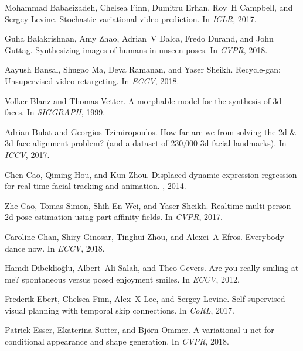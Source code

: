 \documentclass{article}
\begin{document}
\clearpage
\begin{thebibliography}{10}
	\providecommand{\url}[1]{\texttt{#1}}
	\providecommand{\urlprefix}{URL }
	\providecommand{\doi}[1]{https://doi.org/#1}
	Mohammad Babaeizadeh, Chelsea Finn, Dumitru Erhan, Roy~H Campbell, and Sergey
	Levine.
	\newblock Stochastic variational video prediction.
	\newblock In {\em ICLR}, 2017.
	
	Guha Balakrishnan, Amy Zhao, Adrian~V Dalca, Fredo Durand, and John Guttag.
	\newblock Synthesizing images of humans in unseen poses.
	\newblock In {\em CVPR}, 2018.
	
	Aayush Bansal, Shugao Ma, Deva Ramanan, and Yaser Sheikh.
	\newblock Recycle-gan: Unsupervised video retargeting.
	\newblock In {\em ECCV}, 2018.
	
	Volker Blanz and Thomas Vetter.
	\newblock A morphable model for the synthesis of 3d faces.
	\newblock In {\em SIGGRAPH}, 1999.
	
	Adrian Bulat and Georgios Tzimiropoulos.
	\newblock How far are we from solving the 2d \& 3d face alignment problem? (and
	a dataset of 230,000 3d facial landmarks).
	\newblock In {\em ICCV}, 2017.
	
	Chen Cao, Qiming Hou, and Kun Zhou.
	\newblock Displaced dynamic expression regression for real-time facial tracking
	and animation.
	, 2014.
	
	Zhe Cao, Tomas Simon, Shih-En Wei, and Yaser Sheikh.
	\newblock Realtime multi-person 2d pose estimation using part affinity fields.
	\newblock In {\em CVPR}, 2017.
	
	Caroline Chan, Shiry Ginosar, Tinghui Zhou, and Alexei~A Efros.
	\newblock Everybody dance now.
	\newblock In {\em ECCV}, 2018.
	
	Hamdi Dibeklio{\u{g}}lu, Albert~Ali Salah, and Theo Gevers.
	\newblock Are you really smiling at me? spontaneous versus posed enjoyment
	smiles.
	\newblock In {\em ECCV}, 2012.
	
	Frederik Ebert, Chelsea Finn, Alex~X Lee, and Sergey Levine.
	\newblock Self-supervised visual planning with temporal skip connections.
	\newblock In {\em CoRL}, 2017.
	
	Patrick Esser, Ekaterina Sutter, and Bj{\"o}rn Ommer.
	\newblock A variational u-net for conditional appearance and shape generation.
	\newblock In {\em CVPR}, 2018.
	

\end{thebibliography}
\end{document}
